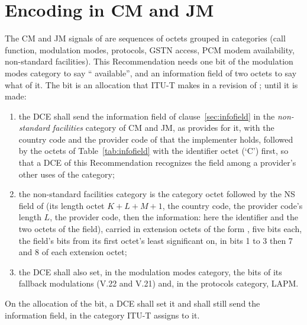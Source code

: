 \section{Encoding in CM and JM}
The CM and JM signals of  are sequences of octets grouped in
categories (call function, modulation modes, protocols, GSTN access, PCM
modem availability, non-standard facilities).  This Recommendation needs
one bit of the modulation modes category to say ``\recname{} available'',
and an information field of two octets to say what of it.  The bit is an
allocation that ITU-T makes in a revision of ; until it is made:
\begin{enumerate}[label=\alph*)]
\item the DCE shall send the information field of clause~\ref{sec:infofield}
  in the \emph{non-standard facilities} category of CM and JM, as 
  provides for it, with the country code and the provider code of
   that the implementer holds, followed by the octets of
  Table~\ref{tab:infofield} with the identifier octet  (`C')
  first, so that a DCE of this Recommendation recognizes the field among
  a provider's other uses of the category;
\item the non-standard facilities category is the category octet
   followed by the NS field of  (its length octet
  $K + L + M + 1$, the country code, the provider code's length $L$, the
  provider code, then the information: here the identifier and the two
  octets of the field), carried in extension octets of the form
  , five bits each, the field's bits from its first
  octet's least significant on, in bits 1 to 3 then 7 and 8 of each
  extension octet;
\item the DCE shall also set, in the modulation modes category, the bits
  of its fallback modulations (V.22 and V.21) and, in the protocols
  category, LAPM.
\end{enumerate}
On the allocation of the bit, a DCE shall set it and shall still send the
information field, in the category ITU-T assigns to it.

